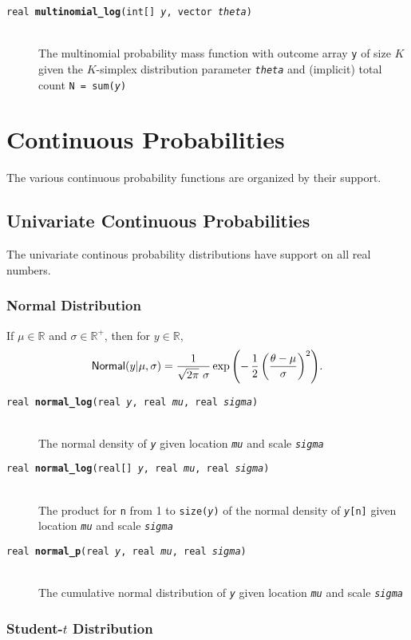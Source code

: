 \documentclass[10pt]{report}
\newcommand{\code}[1]{{\tt #1}}
\newcommand{\distro}[1]{\mbox{\sf #1}}
\newcommand{\reals}{\mathbb{R}}
\newcommand{\posreals}{\mathbb{R}^+}
\newcommand{\fitem}[4]{\item[{\tt #1 {\bfseries #2}(#3)}]\mbox{ } \\[4pt] #4}
\newcommand{\farg}[1]{{\tt\slshape #1}}
\begin{document}
\begin{description}
 \fitem{real}{multinomial\_log}{int[] \farg{y}, vector
    \farg{theta}}{The multinomial probability mass function with
    outcome array \code{y} of size $K$ given the $K$-simplex
    distribution parameter \farg{theta} and (implicit) total count
    \code{N = sum(\farg{y})}}
\end{description}


\chapter{Continuous Probabilities}\label{continuous-prob-functions.chapter}

The various continuous probability functions are organized by their
support.

\section{Univariate Continuous Probabilities}

The univariate continous probability distributions have support on all
real numbers.

\subsection{Normal Distribution}

If $\mu \in \reals$ and $\sigma \in \posreals$, then for $y \in
\reals$,
\[
\distro{Normal}(y|\mu,\sigma)
=
\frac{1}{\sqrt{2 \pi} \ \sigma}
\exp\left( - \, \frac{1}{2}
           \left(  \frac{\theta - \mu}{\sigma} \right)^2
    \right)
\!.
\]

\begin{description}
\fitem{real}{normal\_log}{real \farg{y}, real \farg{mu}, real
\farg{sigma}}{The normal density of \farg{y} given location
\farg{mu} and scale \farg{sigma}}
%
\fitem{real}{normal\_log}{real[] \farg{y}, real \farg{mu}, real
  \farg{sigma}}{The product for \code{n} from 1 to
  \code{size(\farg{y})} of the normal density of
  \code{\farg{y}[n]} given location \farg{mu} and scale \farg{sigma}}
%
\fitem{real}{normal\_p}{real \farg{y}, real \farg{mu}, real
  \farg{sigma}}{The cumulative normal distribution of \farg{y}
  given location \farg{mu} and scale \farg{sigma}}
\end{description}


\subsection{Student-$t$ Distribution}
\end{document}
